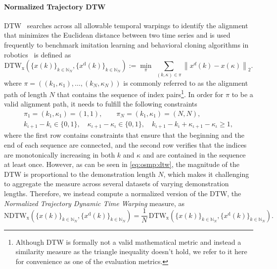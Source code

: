 \paragraph{Normalized Trajectory DTW}
\gls{DTW}~\citep{sakoe1978dynamic} searches across all allowable temporal warpings to identify the alignment that minimizes the Euclidean distance between two time series and is used frequently to benchmark imitation learning and behavioral cloning algorithms in robotics~\citep{urain2020imitationflow, perez2023stable, nawaz2024learning} is defined as
\begin{equation}\label{eq:osmp:dtw}
    \mathrm{DTW}_\mathrm{x}\left (\{x(k)\}_{k\in\mathbb{N}_N},\{x^{\mathrm d}(k)\}_{k\in\mathbb{N}_N} \right ) := \min_{\pi}\;\sum_{(k, \kappa) \in \pi} \left \lVert x^{d}(k)-x(\kappa) \right \rVert_2.
\end{equation}
where $\pi = ((k_1, \kappa_1), \dots, (k_N, \kappa_N))$ is commonly referred to as the alignment path of length $N$ that contains the sequence of index pairs\footnote{Although \gls{DTW} is formally not a valid mathematical metric and instead a similarity measure as the triangle inequality doesn't hold, we refer to it here for convenience as one of the evaluation metrics.}. In order for $\pi$ to be a valid alignment path, it needs to fulfill the following constraints
\begin{equation}
\begin{split}
    \pi_1 = (k_1, \kappa_1) = (1,1),
    \qquad
    \pi_N = (k_1, \kappa_1) = (N,N),\\
    k_{\iota+1} - k_{\iota} \in \{0, 1\}, 
    \quad 
    \kappa_{\iota+1} - \kappa_{\iota} \in \{0, 1\},
    \quad
    k_{\iota+1} - k_{\iota} + \kappa_{\iota+1} - \kappa_{\iota} \geq 1,
\end{split}
\end{equation}
where the first row contains constraints that ensure that the beginning and the end of each sequence are connected, and the second row verifies that the indices are monotonically increasing in both $k$ and $\kappa$ and are contained in the sequence at least once.
However, as can be seen in \eqref{eq:osmp:dtw}, the magnitude of the \gls{DTW} is proportional to the demonstration length $N$, which makes it challenging to aggregate the measure across several datasets of varying demonstration lengths. Therefore, we instead compute a normalized version of the \gls{DTW}, the \emph{Normalized Trajectory Dynamic Time Warping} measure, as
\begin{equation}
    \mathrm{NDTW}_\mathrm{x}\left (\{x(k)\}_{k\in\mathbb{N}_N},\{x^{\mathrm d}(k)\}_{k\in\mathbb{N}_N} \right ) = \frac{1}{N} \, \mathrm{DTW}_\mathrm{x}\left (\{x(k)\}_{k\in\mathbb{N}_N},\{x^{\mathrm d}(k)\}_{k\in\mathbb{N}_N} \right ).
\end{equation}

